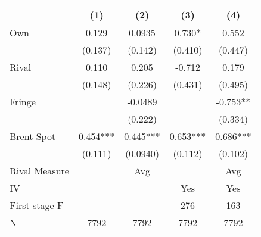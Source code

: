 {
\def\sym#1{\ifmmode^{#1}\else\(^{#1}\)\fi}
\begin{tabular}{l*{4}{c}}
\toprule
                &\multicolumn{1}{c}{(1)}   &\multicolumn{1}{c}{(2)}   &\multicolumn{1}{c}{(3)}   &\multicolumn{1}{c}{(4)}   \\
\midrule
Own             &    0.129   &   0.0935   &    0.730*  &    0.552   \\
                &  (0.137)   &  (0.142)   &  (0.410)   &  (0.447)   \\
\addlinespace
Rival           &    0.110   &    0.205   &   -0.712   &    0.179   \\
                &  (0.148)   &  (0.226)   &  (0.431)   &  (0.495)   \\
\addlinespace
Fringe          &            &  -0.0489   &            &   -0.753** \\
                &            &  (0.222)   &            &  (0.334)   \\
\addlinespace
Brent Spot      &    0.454***&    0.445***&    0.653***&    0.686***\\
                &  (0.111)   & (0.0940)   &  (0.112)   &  (0.102)   \\
\midrule
Rival Measure   &            &      Avg   &            &      Avg   \\
IV              &            &            &      Yes   &      Yes   \\
First-stage F   &            &            &      276   &      163   \\
N               &     7792   &     7792   &     7792   &     7792   \\
\bottomrule
\end{tabular}
}
